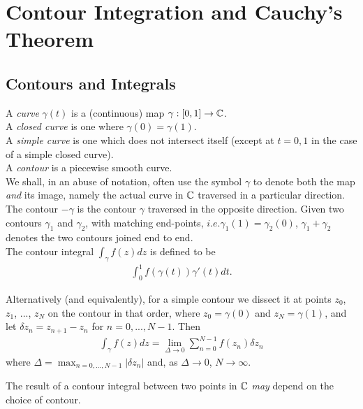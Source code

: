 \documentclass[a4paper]{article}
\begin{document}
\newpage

\section{Contour Integration and Cauchy's Theorem}
\subsection{Contours and Integrals}

\begin{defi}
A \emph{curve} $\gamma(t)$ is a (continuous) map $\gamma:[0,1] \to \mathbb{C}$.\\
A \emph{closed curve} is one where $\gamma(0) = \gamma(1)$.\\
A \emph{simple curve} is one which does not intersect itself (except at $t=0,1$ in the case of a simple closed curve).\\
A \emph{contour} is a piecewise smooth curve.\\
We shall, in an abuse of notation, often use the symbol $\gamma$ to denote both the map \emph{and} its image, namely the actual curve in $\mathbb{C}$ traversed in a particular direction.\\
The contour $-\gamma$ is the contour $\gamma$ traversed in the opposite direction. Given two contours $\gamma_1$ and $\gamma_2$, with matching end-points, $i.e. \gamma_1(1) = \gamma_2(0)$, $\gamma_1 + \gamma_2$ denotes the two contours joined end to end.\\
The contour integral $\int_\gamma f(z) dz$ is defined to be 
\begin{equation*}
\begin{aligned}
\int_0^1 f(\gamma(t)) \gamma'(t) dt.
\end{aligned}
\end{equation*}
\end{defi}
Alternatively (and equivalently), for a simple contour we dissect it at points $z_0$, $z_1$, ..., $z_N$ on the contour in that order, where $z_0 = \gamma(0)$ and $z_N = \gamma(1)$, and let $\delta z_n = z_{n+1}-z_n$ for $n=0,...,N-1$. Then
\begin{equation*}
\begin{aligned}
\int_\gamma f(z) dz = \lim_{\Delta \to 0} \sum_{n=0}^{N-1} f(z_n) \delta z_n
\end{aligned}
\end{equation*}
where $\Delta = \max_{n=0,...,N-1} |\delta z_n|$ and, as $\Delta \to 0$, $N \to \infty$.

The result of a contour integral between two points in $\mathbb{C}$ \emph{may} depend on the choice of contour.
\end{document}
